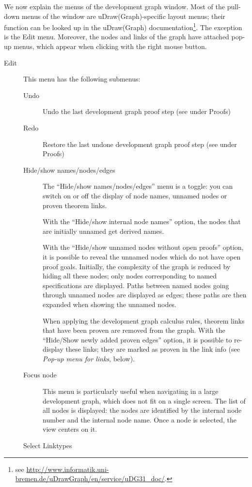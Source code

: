 \documentclass{article}
\begin{document}
We now explain the menus of the development graph window.
Most of the pull-down menus of the window are uDraw(Graph)-specific
layout menus;
their function can be looked up in the uDraw(Graph) documentation\footnote{see
\url{http://www.informatik.uni-bremen.de/uDrawGraph/en/service/uDG31\_doc/}.}.
The exception is the Edit menu. Moreover, the nodes and links
of the graph have attached pop-up menus, which appear when
clicking with the right mouse button.

\begin{description}
\item[Edit] This menu has the following submenus:
\begin{description}
\item[Undo] Undo the last development graph proof step (see under Proofs)
\item[Redo] Restore the last undone development graph proof step (see
  under Proofs)
\item[Hide/show names/nodes/edges]
The ``Hide/show names/nodes/edges'' menu is a toggle:
you can switch on or off the display of node names, unnamed nodes or
proven theorem links.

With the ``Hide/show internal node names'' option, the nodes that
are initially unnamed get derived names.

With the ``Hide/show unnamed nodes without open proofs'' option, it is possible
to reveal the unnamed nodes which do not have open proof goals.
Initially, the complexity of the graph is reduced by hiding all these nodes;
only nodes corresponding to named specifications are displayed.
Paths between named nodes going through unnamed nodes
are displayed as edges; these paths are then expanded when showing the
unnamed nodes.

When applying the development graph calculus rules, theorem links that have
been proven are removed from the graph. With the ``Hide/Show newly added
proven edges'' option, it is possible to re-display these links; they are marked
as proven in the link info (see \emph{Pop-up menu for links}, below).

\item[Focus node]

This menu is particularly useful when navigating in a large development graph,
which does not fit on a single screen. The list of all nodes is displayed:
the nodes are identified by the internal node number and the internal node name.
Once a node is selected, the view centers on it.

\item[Select Linktypes]


\end{description}
\end{description}
\end{document}
